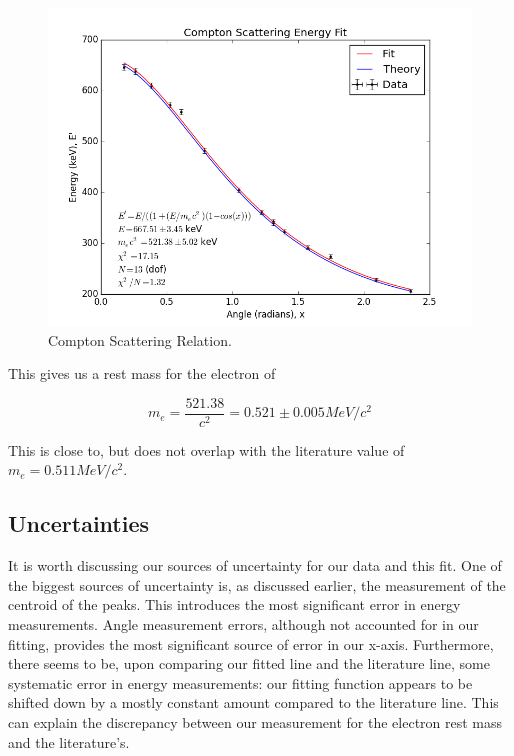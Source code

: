 \documentclass{article}
\begin{document}
\begin{figure}[!htb]
	\centering
	\includegraphics[scale=1]{plots/compton_fit.png}
  	\caption{Compton Scattering Relation.} 
 	\label{compton}
\end{figure}

This gives us a rest mass for the electron of

\begin{equation}
	m_e = \frac{521.38}{c^2} = 0.521 \pm 0.005 MeV/c^2 
\end{equation}

This is close to, but does not overlap with the literature value of $m_e = 0.511 MeV/c^2$.

\subsection{Uncertainties}
It is worth discussing our sources of uncertainty for our data and this fit. One of the biggest sources of uncertainty is, as discussed earlier, the measurement of the centroid of the peaks. This introduces the most significant error in energy measurements. Angle measurement errors, although not accounted for in our fitting, provides the most significant source of error in our x-axis. Furthermore, there seems to be, upon comparing our fitted line and the literature line, some systematic error in energy measurements: our fitting function appears to be shifted down by a mostly constant amount compared to the literature line. This can explain the discrepancy between our measurement for the electron rest mass and the literature's.
\end{document}
